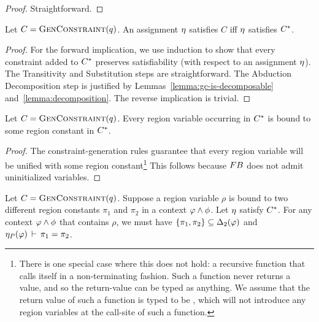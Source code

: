 \begin{proof}
  Straightforward.
\end{proof}

\begin{theorem}
  \label{thm:closure}
Let $C = \textsc{GenConstraint}(q)$.
An assignment $\eta$ satisfies $C$ iff $\eta$ satisfies ${C}^*$.
\end{theorem}

\begin{proof}
  For the forward implication, we use induction to show that every constraint
  added to ${C}^*$ preserves satisfiability (with respect to an assignment $\eta$).
  The Transitivity and Substitution steps are straightforward. The Abduction Decomposition
  step is justified by Lemmas~\ref{lemma:gc-is-decomposable} and~\ref{lemma:decomposition}.
  The reverse implication is trivial.
\end{proof}

\begin{lemma}
  \label{lemma:completely-bound}
Let $C = \textsc{GenConstraint}(q)$.
Every region variable occurring in ${C}^*$ is bound to some region constant in ${C}^*$.
\end{lemma}

\begin{proof}
The constraint-generation rules guarantee that every region variable will
be unified with some region constant\footnote{
There is one special case where this does not hold: a recursive function
that calls itself in a non-terminating fashion. Such a function never
returns a value, and so the return-value can be typed as anything.
We assume that the return value of such a function is typed to be ,
which will not introduce any region variables at the call-site of such a function.}
This follows because ${\sc FB}$ does not admit uninitialized variables.
\end{proof}

\begin{lemma}
  \label{lemma:two-bindings}
Let $C = \textsc{GenConstraint}(q)$.
Suppose a region variable $\rho$ is bound to two different region constants $\pi_1$
and $\pi_2$ in a context $\varphi \wedge \phi$. %
Let $\eta$ satisfy ${C}^*$.
For any context $\varphi \wedge \phi$ that contains $\rho$, we must have
$\{ \pi_1, \pi_2 \} \subseteq {\Delta_2}(\varphi)$ and
$\eta_P(\varphi)\,\vdash\,\pi_1 = \pi_2$.
\end{lemma}

